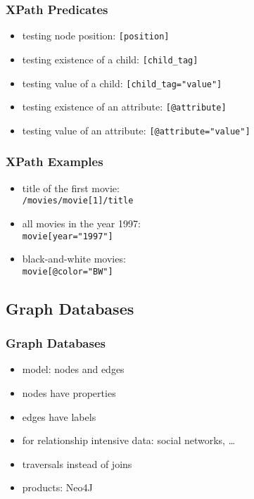 \documentclass[dvipsnames]{beamer}
\theoremstyle{plain}
\begin{document}
\begin{frame}
  \frametitle{XPath Predicates}

  \begin{itemize}
    \item testing node position: \lstinline|[position]|

    \pause
    \medskip
    \item testing existence of a child: \lstinline|[child_tag]|
    \item testing value of a child: \lstinline|[child_tag="value"]|

    \pause
    \medskip
    \item testing existence of an attribute: \lstinline|[@attribute]|
    \item testing value of an attribute: \lstinline|[@attribute="value"]|
  \end{itemize}
\end{frame}

\begin{frame}
  \frametitle{XPath Examples}

  \begin{itemize}
    \item title of the first movie:\\
      \lstinline|/movies/movie[1]/title|

    \pause
    \item all movies in the year 1997:\\
      \lstinline|movie[year="1997"]|

    \pause
    \item black-and-white movies:\\
      \lstinline|movie[@color="BW"]|
  \end{itemize}
\end{frame}

\subsection{Graph Databases}

\begin{frame}
  \frametitle{Graph Databases}

  \begin{itemize}
    \item model: nodes and edges
    \item nodes have properties
    \item edges have labels

    \medskip
    \item for relationship intensive data: social networks, \ldots
    \item traversals instead of joins

    \bigskip
    \item products: Neo4J
  \end{itemize}
\end{frame}
\end{document}
